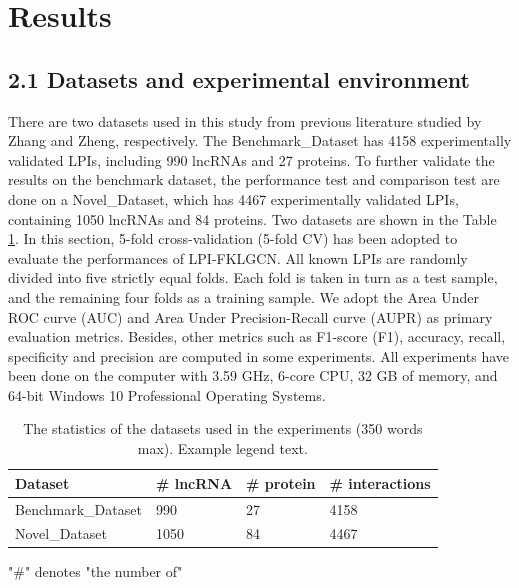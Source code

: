 \documentclass[fleqn,10pt]{wlscirep}
\begin{document}
\section*{Results}
\subsection*{2.1 Datasets and experimental environment}
There are two datasets used in this study from previous literature studied by Zhang\cite{Zhang2018} and Zheng\cite{Zheng2017a}, respectively. The Benchmark\_Dataset has 4158 experimentally validated LPIs, including 990 lncRNAs and 27 proteins. To further validate the results on the benchmark dataset, the performance test and comparison test are done on a Novel\_Dataset, which has 4467 experimentally validated LPIs, containing 1050 lncRNAs and 84 proteins. Two datasets are shown in the Table \ref{tab:datasets}. In this section, 5-fold cross-validation (5-fold CV) has been adopted to evaluate the performances of LPI-FKLGCN. All known LPIs are randomly divided into five strictly equal folds. Each fold is taken in turn as a test sample, and the remaining four folds as a training sample. We adopt the Area Under ROC curve (AUC) and Area Under Precision-Recall curve (AUPR)  as primary evaluation metrics. Besides, other metrics such as F1-score (F1), accuracy, recall, specificity and precision are computed in some experiments. All experiments have been done on the computer with 3.59 GHz, 6-core CPU, 32 GB of memory, and 64-bit Windows 10 Professional Operating Systems.

\begin{table}[ht]
\centering
\caption{\label{tab:datasets} The statistics of the datasets used in the experiments (350 words max). Example legend text.}
\begin{threeparttable}[b]
\begin{tabular}{|l|l|l|l|}
\hline
Dataset & \# lncRNA & \# protein & \# interactions \\
\hline
Benchmark_Dataset & 990 & 27 & 4158\\
\hline
Novel_Dataset & 1050 & 84 & 4467 \\
\hline
\end{tabular}
\begin{tablenotes}
     \item "\#" denotes "the number of"
     \end{tablenotes}
     \end{threeparttable}
\end{table}
\end{document}
